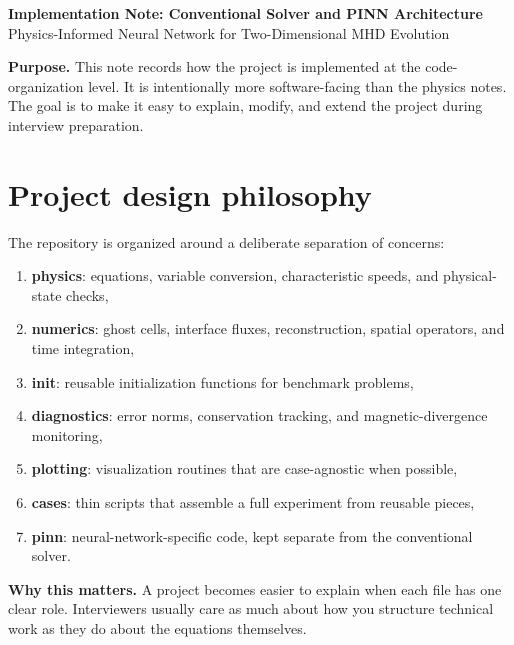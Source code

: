 \documentclass[11pt]{article}
\begin{document}
\begin{center}
    {\LARGE \bfseries \color{TitleBlue} Implementation Note: Conventional Solver and PINN Architecture}\\[0.5em]
    {\large \color{AccentTeal} Physics-Informed Neural Network for Two-Dimensional MHD Evolution}
\end{center}

\vspace{0.5em}

\begin{overviewbox}
\textbf{Purpose.} This note records how the project is implemented at the code-organization level. It is intentionally more software-facing than the physics notes. The goal is to make it easy to explain, modify, and extend the project during interview preparation.
\end{overviewbox}

\section{Project design philosophy}
The repository is organized around a deliberate separation of concerns:
\begin{enumerate}[leftmargin=1.8em]
    \item \textbf{physics}: equations, variable conversion, characteristic speeds, and physical-state checks,
    \item \textbf{numerics}: ghost cells, interface fluxes, reconstruction, spatial operators, and time integration,
    \item \textbf{init}: reusable initialization functions for benchmark problems,
    \item \textbf{diagnostics}: error norms, conservation tracking, and magnetic-divergence monitoring,
    \item \textbf{plotting}: visualization routines that are case-agnostic when possible,
    \item \textbf{cases}: thin scripts that assemble a full experiment from reusable pieces,
    \item \textbf{pinn}: neural-network-specific code, kept separate from the conventional solver.
\end{enumerate}

\begin{implbox}
\textbf{Why this matters.} A project becomes easier to explain when each file has one clear role. Interviewers usually care as much about how you structure technical work as they do about the equations themselves.
\end{implbox}
\end{document}
